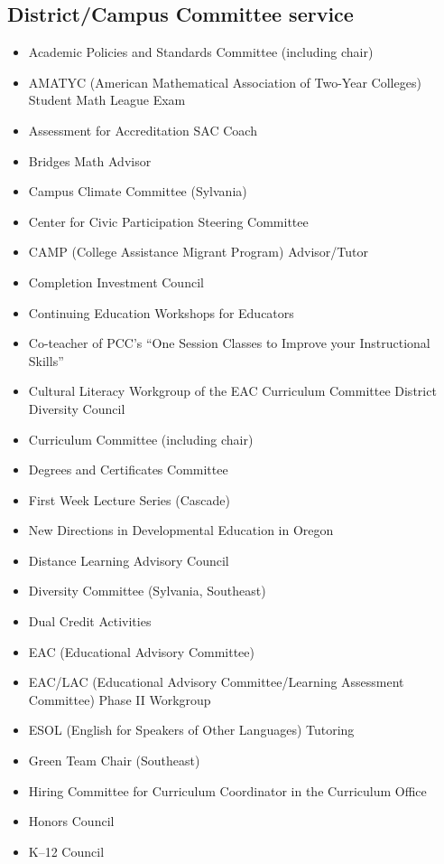 \begin{widepage}
\begin{multicols*}{2}
\section*{District/Campus Committee service}

\begin{itemize}[label={}]
\item Academic Policies and Standards Committee (including chair)
\item AMATYC (American Mathematical Association of Two-Year Colleges) Student Math League Exam
\item Assessment for Accreditation SAC Coach
\item Bridges Math Advisor
\item Campus Climate Committee (Sylvania)
\item Center for Civic Participation Steering Committee
\item CAMP (College Assistance Migrant Program) Advisor/Tutor
\item Completion Investment Council
\item Continuing Education Workshops for Educators
\item Co-teacher of PCC's ``One Session Classes to Improve your Instructional Skills''
\item Cultural Literacy Workgroup of the EAC Curriculum Committee District Diversity Council
\item Curriculum Committee (including chair)
\item Degrees and Certificates Committee
\item First Week Lecture Series (Cascade)
\item New Directions in Developmental Education in Oregon
\item Distance Learning Advisory Council
\item Diversity Committee (Sylvania, Southeast)
\item Dual Credit Activities
\item EAC (Educational Advisory Committee)
\item EAC/LAC (Educational Advisory Committee/Learning Assessment Committee) Phase II Workgroup
\item ESOL (English for Speakers of Other Languages) Tutoring
\item Green Team Chair (Southeast)
\item Hiring Committee for Curriculum Coordinator in the Curriculum Office
\item Honors Council
\item K--12 Council

\end{itemize}
\end{multicols*}
\end{widepage}
